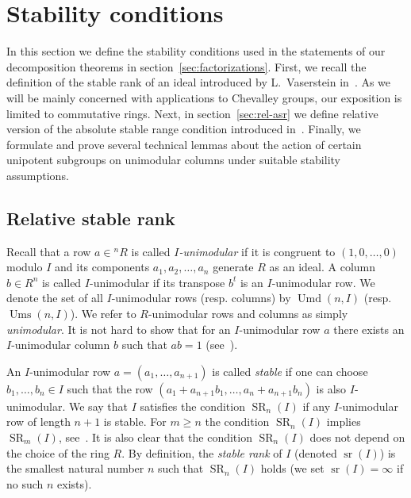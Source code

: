 \documentclass[11pt]{amsart}
\theoremstyle{plain}
\numberwithin{equation}{section}
\numberwithin{lemma}{section}
\theoremstyle{definition}
\theoremstyle{remark}
\DeclareMathOperator{\SR}{SR}
\DeclareMathOperator{\sr}{sr}
\DeclareMathOperator{\Ums}{Ums}
\DeclareMathOperator{\Umd}{Umd}
\begin{document}
\section{Stability conditions}\label{sec:stability-conditions}
In this section we define the stability conditions used in the statements of our decomposition theorems in section~\ref{sec:factorizations}.
First, we recall the definition of the stable rank of an ideal introduced by L.~Vaserstein in~\cite{Va69, Va71}.
As we will be mainly concerned with applications to Chevalley groups, our exposition is limited to commutative rings.
Next, in section~\ref{sec:rel-asr} we define relative version of the absolute stable range condition introduced in~\cite{EO, MKV}.
Finally, we formulate and prove several technical lemmas about the action of certain unipotent subgroups on unimodular columns under suitable stability assumptions.

\subsection{Relative stable rank}
Recall that a row $a\in{}^n\!R$ is called \emph{$I$-unimodular} if it is congruent to $(1, 0, \ldots, 0)$ modulo $I$ and its components $a_1, a_2, \ldots, a_n$ generate $R$ as an ideal.
A column $b \in R^n$ is called $I$-unimodular if its transpose $b^t$ is an $I$-unimodular row.
We denote the set of all $I$-unimodular rows (resp. columns) by $\Umd(n, I)$ (resp. $\Ums(n, I)$).
We refer to $R$-unimodular rows and columns as simply \emph{unimodular}.
It is not hard to show that for an $I$-unimodular row $a$ there exists an $I$-unimodular column $b$ such that $ab=1$ (see~\cite[\S2]{Va69}).

An $I$-unimodular row $a=(a_1, \ldots, a_{n+1})$ is called \emph{stable} if one can choose $b_1, \ldots, b_n\in I$ such that the row $(a_1+a_{n+1}b_1, \ldots, a_n+a_{n+1}b_n)$ is also $I$-unimodular. 
We say that $I$ satisfies the condition $\SR_n(I)$ if any $I$-unimodular row of length $n+1$ is stable.
For $m \geqslant n$ the condition $\SR_n(I)$ implies $\SR_m(I)$, see~\cite[Theorem~1]{Va71}.
It is also clear that the condition $\SR_n(I)$ does not depend on the choice of the ring $R$.
By definition, the \emph{stable rank} of $I$ (denoted $\sr(I)$) is the smallest natural number $n$ such that $\SR_n(I)$ holds (we set $\sr(I)=\infty$ if no such $n$ exists).
\end{document}
